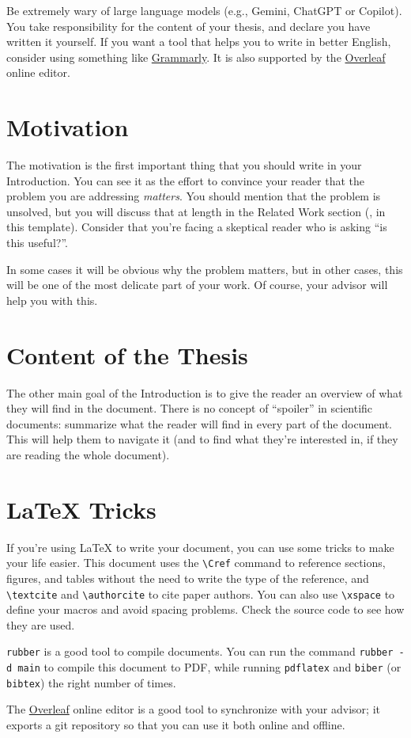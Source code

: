 Be extremely wary of large language models (e.g., Gemini, ChatGPT or Copilot). You take
responsibility for the content of your thesis, and declare you have written it yourself.
If you want a tool that helps you to write in better English, consider using something like
\href{https://grammarly.com}{Grammarly}. It is also supported by the
\href{https://www.overleaf.com}{Overleaf} online \latex editor.

\section{Motivation}

The motivation is the first important thing that you should write in your Introduction.
You can see it as the effort to convince your reader that the problem you are addressing
\emph{matters}. You should mention that the problem is unsolved, but you will discuss that at
length in the Related Work section (, in this template). Consider that
you're facing a skeptical reader who is asking ``is this useful?''.

In some cases it will be obvious why the problem matters, but in other cases, this will be
one of the most delicate part of your work. Of course, your advisor will help you with this.

\section{Content of the Thesis}

The other main goal of the Introduction is to give the reader an overview of what they will
find in the document. There is no concept of ``spoiler'' in scientific documents: summarize
what the reader will find in every part of the document. This will help them to navigate it
(and to find what they're interested in, if they are reading the whole document).

\section{\xspace{\LaTeX} Tricks}

If you're using \LaTeX{} to write your document, you can use some tricks to make your life
easier. This document uses the \verb|\Cref| command to reference sections, figures, and tables
without the need to write the type of the reference, and \verb|\textcite| and
\verb|\authorcite| to cite paper authors. You can also use \verb|\xspace| to define your macros
and avoid spacing problems. Check the source code to see how they are used.

\texttt{rubber} is a good tool to compile \latex documents. You can run the command
\texttt{rubber -d main} to compile this document to PDF, while running \texttt{pdflatex}
and \texttt{biber} (or \texttt{bibtex}) the right number of times.

The \href{https://www.overleaf.com}{Overleaf} online editor is a good tool to synchronize with
your advisor; it exports a git repository so that you can use it both online and offline.

